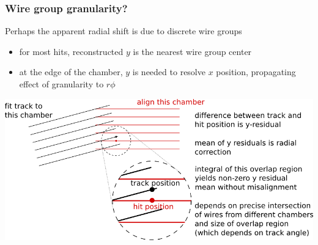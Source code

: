 \documentclass[compress]{beamer}
\begin{document}
\begin{frame}
\frametitle{Wire group granularity?}

Perhaps the apparent radial shift is due to discrete wire groups

\begin{itemize}
\item for most hits, reconstructed $y$ is the nearest wire group center
\item at the edge of the chamber, $y$ is needed to resolve $x$
  position, propagating effect of granularity to $r\phi$
\end{itemize}

\vfill
\includegraphics[width=\linewidth]{vertical_residual.png}

\end{frame}
\end{document}
